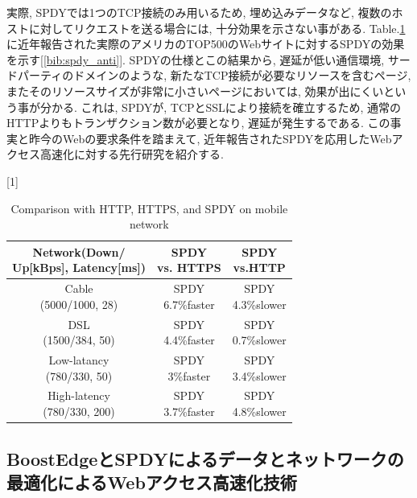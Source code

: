 \documentclass[twocolumn]{jsarticle}
\begin{document}
実際, SPDYでは1つのTCP接続のみ用いるため, 埋め込みデータなど, 複数のホストに対してリクエストを送る場合には, 十分効果を示さない事がある.
Table.\ref{tbl:comp}に近年報告された実際のアメリカのTOP500のWebサイトに対するSPDYの効果を示す[\ref{bib:spdy_anti}].
SPDYの仕様とこの結果から, 遅延が低い通信環境, サードパーティのドメインのような, 新たなTCP接続が必要なリソースを含むページ,
またそのリソースサイズが非常に小さいページにおいては, 効果が出にくいという事が分かる.
これは, SPDYが, TCPとSSLにより接続を確立するため, 通常のHTTPよりもトランザクション数が必要となり, 遅延が発生するである.
この事実と昨今のWebの要求条件を踏まえて, 近年報告されたSPDYを応用したWebアクセス高速化に対する先行研究を紹介する.
\begin{table}[h]
\caption{Comparison with HTTP, HTTPS, and SPDY on mobile network}
\scalebox{0.87}[1]{
\begin{tabular}{|c|c|c|}
\hline
\shortstack{Network(Down/ \\Up[kBps], Latency[ms])}&\shortstack{SPDY\\ vs.
HTTPS} & \shortstack{SPDY\\ vs.HTTP}\\ \hline \hline
\shortstack{Cable\\(5000/1000, 28)} & \shortstack{SPDY\\ 6.7\%faster}
&\shortstack{SPDY\\ 4.3\%slower}
\\
\hline \shortstack{DSL\\(1500/384, 50)} & \shortstack{SPDY\\ 4.4\%faster} &
\shortstack{SPDY\\ 0.7\%slower} \\ \hline \shortstack{Low-latancy\\(780/330,
50)} & \shortstack{SPDY\\ 3\%faster} & \shortstack{SPDY\\ 3.4\%slower} \\
\hline \shortstack{High-latency\\(780/330, 200)} & \shortstack{SPDY\\
3.7\%faster} & \shortstack{SPDY\\ 4.8\%slower} \\ \hline
\end{tabular}
}
\label{tbl:comp}
\end{table}
\subsection{BoostEdgeとSPDYによるデータとネットワークの最適化によるWebアクセス高速化技術}
\end{document}
